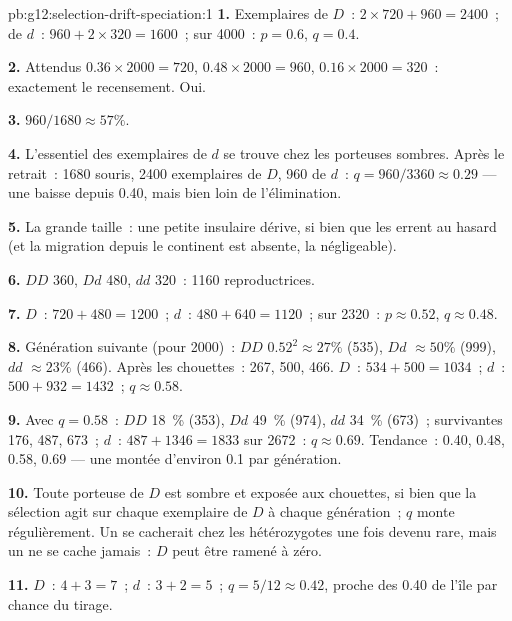 \begin{solution}{pb:g12:selection-drift-speciation:1}
\textbf{1.} Exemplaires de $D$~: $2 \times 720 + 960 = 2400$~; de $d$~: $960 +
2 \times 320 = 1600$~; sur 4000~: $p = 0.6$, $q = 0.4$.

\textbf{2.} Attendus $0.36 \times 2000 = 720$, $0.48 \times 2000 =
960$, $0.16 \times 2000 = 320$~: exactement le recensement. Oui.

\textbf{3.} $960/1680 \approx 57\%$.

\textbf{4.} L'essentiel des exemplaires de $d$ se trouve chez les
porteuses sombres. Après le retrait~: 1680 souris, 2400 exemplaires de
$D$, 960 de $d$~: $q = 960/3360 \approx
0.29$ --- une baisse depuis 0.40, mais bien loin de l'élimination.

\textbf{5.} La grande taille~: une petite  insulaire dérive,
si bien que les  errent au hasard (et la migration depuis le
continent est absente, la  négligeable).

\textbf{6.} $DD$ 360, $Dd$ 480, $dd$ 320~: 1160 reproductrices.

\textbf{7.} $D$~: $720 + 480 = 1200$~; $d$~: $480 + 640 = 1120$~; sur
2320~: $p \approx 0.52$, $q \approx 0.48$.

\textbf{8.} Génération suivante (pour 2000)~: $DD$ $0.52^2 \approx 27\%$
(535), $Dd$ $\approx 50\%$ (999), $dd$ $\approx 23\%$ (466). Après les
chouettes~: 267, 500, 466. $D$~: $534 + 500 = 1034$~; $d$~: $500 + 932 =
1432$~; $q \approx 0.58$.

\textbf{9.} Avec $q = 0.58$~: $DD$ 18~\% (353), $Dd$ 49~\% (974), $dd$
34~\% (673)~; survivantes 176, 487, 673~; $d$~: $487 + 1346 = 1833$ sur
2672~: $q \approx 0.69$. Tendance~: 0.40, 0.48, 0.58, 0.69 --- une
montée d'environ 0.1 par génération.

\textbf{10.} Toute porteuse de $D$ est sombre et exposée aux
chouettes, si bien que la sélection agit sur chaque exemplaire de $D$ à
chaque génération~; $q$ monte régulièrement. Un   se
cacherait chez les hétérozygotes une fois devenu rare, mais un 
 ne se cache jamais~: $D$ peut être ramené à zéro.

\textbf{11.} $D$~: $4 + 3 = 7$~; $d$~: $3 + 2 = 5$~; $q = 5/12 \approx
0.42$, proche des 0.40 de l'île par chance du tirage.


\end{solution}
